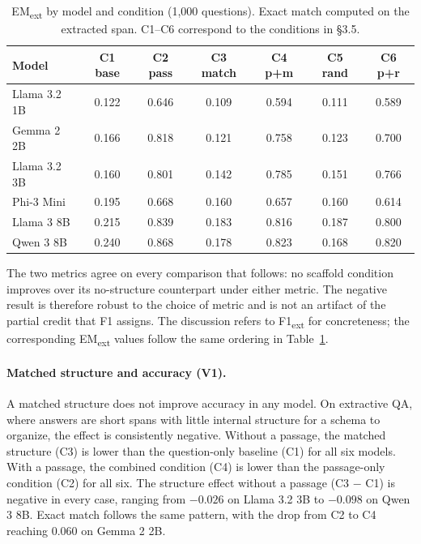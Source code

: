 \documentclass{article}
\begin{document}
\begin{table}[h]
\centering
\begin{tabular}{lcccccc}
\toprule
Model & C1 base & C2 pass & C3 match & C4 p+m & C5 rand & C6 p+r \\
\midrule
Llama 3.2 1B & 0.122 & 0.646 & 0.109 & 0.594 & 0.111 & 0.589 \\
Gemma 2 2B   & 0.166 & 0.818 & 0.121 & 0.758 & 0.123 & 0.700 \\
Llama 3.2 3B & 0.160 & 0.801 & 0.142 & 0.785 & 0.151 & 0.766 \\
Phi-3 Mini   & 0.195 & 0.668 & 0.160 & 0.657 & 0.160 & 0.614 \\
Llama 3 8B   & 0.215 & 0.839 & 0.183 & 0.816 & 0.187 & 0.800 \\
Qwen 3 8B    & 0.240 & 0.868 & 0.178 & 0.823 & 0.168 & 0.820 \\
\bottomrule
\end{tabular}
\caption{EM\textsubscript{ext} by model and condition (1,000 questions). Exact match computed on the extracted span. C1--C6 correspond to the conditions in \S3.5.}
\label{tab:emext}
\end{table}

The two metrics agree on every comparison that follows: no scaffold condition improves over its no-structure counterpart under either metric. The negative result is therefore robust to the choice of metric and is not an artifact of the partial credit that F1 assigns. The discussion refers to F1\textsubscript{ext} for concreteness; the corresponding EM\textsubscript{ext} values follow the same ordering in Table~\ref{tab:emext}.

\paragraph{Matched structure and accuracy (V1).}
A matched structure does not improve accuracy in any model. On extractive QA, where answers are short spans with little internal structure for a schema to organize, the effect is consistently negative. Without a passage, the matched structure (C3) is lower than the question-only baseline (C1) for all six models. With a passage, the combined condition (C4) is lower than the passage-only condition (C2) for all six. The structure effect without a passage (C3 $-$ C1) is negative in every case, ranging from $-0.026$ on Llama 3.2 3B to $-0.098$ on Qwen 3 8B. Exact match follows the same pattern, with the drop from C2 to C4 reaching 0.060 on Gemma 2 2B.
\end{document}
